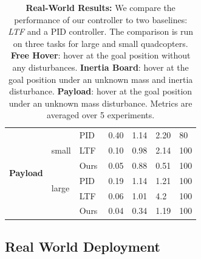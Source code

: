 \begin{table}[t]
\begin{tabular}{lllllll}
\multicolumn{1}{c}{\multirow{6}{*}{\textbf{Payload}}} & \multirow{3}{*}{small} & PID & 0.40 & 1.14 & 2.20 & 80 \\ %
&  & LTF~\cite{LTF} & 0.10 & 0.98 & 2.14 & 100 \\
\multicolumn{1}{c}{} &  & Ours & 0.05 & 0.88 & 0.51 & 100 \\ \cline{2-7} 
\multicolumn{1}{c}{} & \multirow{2}{*}{large} & PID & 0.19 & 1.14 & 1.21 & 100 \\ %
&  & LTF~\cite{LTF} & 0.06 & 1.01 & 4.2 & 100 \\
\multicolumn{1}{c}{} &  & Ours & 0.04 & 0.34 & 1.19 & 100 \\
\bottomrule
\end{tabular}
\vspace{2ex}
\caption{\label{tab:rw_results} \textbf{Real-World  Results:} We compare the performance of our controller to two baselines: \emph{LTF} and a PID controller. The comparison is run on three tasks for large and small quadcopters. \textbf{Free Hover}: hover at the goal position without any disturbances. \textbf{Inertia Board}: hover at the goal position under an unknown mass and inertia disturbance. \textbf{Payload}: hover at the goal position under an unknown mass disturbance.  
Metrics are averaged over 5 experiments.}
\end{table}



\subsection{Real World Deployment}

